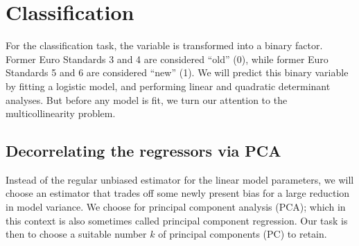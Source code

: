 \documentclass[a4paper, 12pt]{article}
\newcommand{\varr}[1]{\texttt{\StrSubstitute{#1}{ }{\_\allowbreak}}}
\begin{document}
\pagebreak
\section{Classification}

For the classification task, the variable \varr{euro standard} is transformed into a binary factor. Former Euro Standards 3 and 4 are considered ``old'' (0), while former Euro Standards 5 and 6 are considered ``new'' (1). We will predict this binary variable by fitting a logistic model, and performing linear and quadratic determinant analyses. But before any model is fit, we turn our attention to the multicollinearity problem.

\subsection*{Decorrelating the regressors via PCA}

Instead of the regular unbiased estimator for the linear model parameters, we will choose an estimator that trades off some newly present bias for a large reduction in model variance. We choose for principal component analysis (PCA); which in this context is also sometimes called principal component regression. Our task is then to choose a suitable number $k$ of principal components (PC) to retain.
\end{document}
